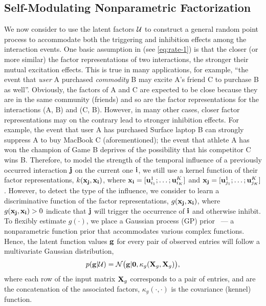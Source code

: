 \subsection{Self-Modulating Nonparametric Factorization}
We now consider to use the latent factors ${\mathcal{U}}$ to construct a general random point process to accommodate  both the triggering and inhibition effects among the interaction events. One basic assumption in \citep{zhe2018stochastic}  (see \eqref{eq:rate-1}) is that the closer (or more similar) the factor representations of two interactions, the stronger their mutual excitation effects. This is true in many applications, for example, ``the event that \textit{user} A purchased \textit{commodity} B may excite A's friend C to purchase B as well''. Obviously, the factors of A and C are expected to be close because they are in the same community (\ie friends) and so are the factor representations for the interactions (A, B) and (C, B).  However, in many other cases,  closer factor representations may on the contrary lead to stronger inhibition effects. For example, the event that user A has purchased Surface laptop B can strongly suppress A to buy MacBook C (aforementioned); the event that athlete A has won the champion of Game B deprives of the possibility that his competitor C wins B. Therefore, to model the strength of the temporal influence of a previously occurred interaction ${\bf j}$ on the current one ${\bf i}$, we still use a kernel function of their factor representations, $k({\bf x}_{{\bf j}}, {\bf x}_{{\bf i}})$, where
${\bf x}_{{\bf i}} = [{\bf u}^1_{i_1}; \ldots; {\bf u}^K_{i_K}]$ and ${\bf x}_{{\bf j}} = [{\bf u}^1_{j_1}; \ldots; {\bf u}^K_{j_K}]$. However, to detect the type of the influence, we consider to learn a discriminative function of the factor representations, $g({\bf x}_{{\bf j}}, {\bf x}_{{\bf i}})$, where $g({\bf x}_{{\bf j}}, {\bf x}_{{\bf i}})>0$ indicate that ${\bf j}$ will trigger the occurrence of ${\bf i}$ and otherwise inhibit. To flexibly estimate $g(\cdot)$, we place a Gaussian process (GP) prior~\citep{Rasmussen06GP} --- a nonparametric function prior that accommodates various complex functions. Hence, the latent function values ${\bf g}$ for every pair of observed entries will follow a multivariate Gaussian distribution, 
\begin{align}
p({\bf g}|{\mathcal{U}}) = \mathcal{N}\big({\bf g}|{\bf 0}, \kappa_g({\bf X}_g, {\bf X}_g)\big), \label{eq:gp-g}
\end{align}
where each row of the input matrix ${\bf X}_g$ corresponds to a pair of entries, and are the concatenation of the associated factors, $\kappa_g(\cdot, \cdot)$ is the covariance (kennel) function. 


